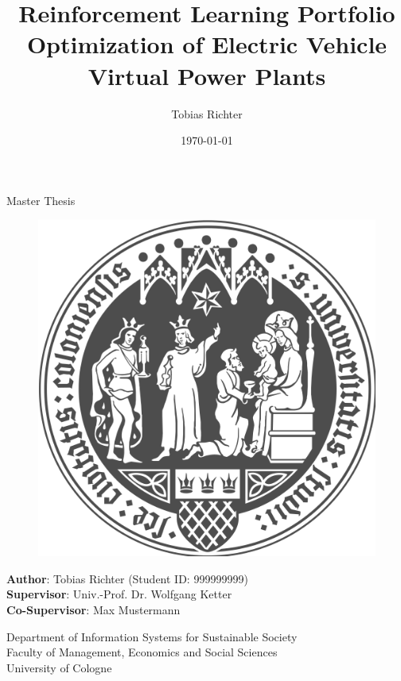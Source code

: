 \documentclass[a4paper, twoside, 12pt]{article}
\author{Tobias Richter}
\date{\today}
\title{Reinforcement Learning Portfolio Optimization of Electric Vehicle Virtual Power Plants}
\newcommand{\thesisauthor}{Tobias Richter}
\newcommand{\studentID}{999999999}
\newcommand{\thesistype}{Master Thesis}
\newcommand{\supervisor}{Univ.-Prof. Dr. Wolfgang Ketter}
\newcommand{\cosupervisor}{Max Mustermann}
\begin{document}
\makeatletter
\begin{titlepage}
    \begin{center}
        \vspace*{1cm}

        \Large
        \textbf{\@title}

        \vspace{1.5cm}

        \thesistype{}

        \vspace{1cm}

        \begin{figure}[htbp]
             \centering
             \includegraphics[width=.5\linewidth]{./img/UoC_Logo.png}
        \end{figure}

        \vspace{1cm}

        \large
        \textbf{Author}: \thesisauthor{} (Student ID: \studentID{})\\
        \large
        \textbf{Supervisor}: \supervisor{}\\
        \large
        \textbf{Co-Supervisor}: \cosupervisor{}

        \vspace{1cm}
        \large
        Department of Information Systems for Sustainable Society\\
        Faculty of Management, Economics and Social Sciences\\
        University of Cologne\\

        \vspace{1cm}
        \@date

    \end{center}
\end{titlepage}
\makeatother
\clearpage
\end{document}
